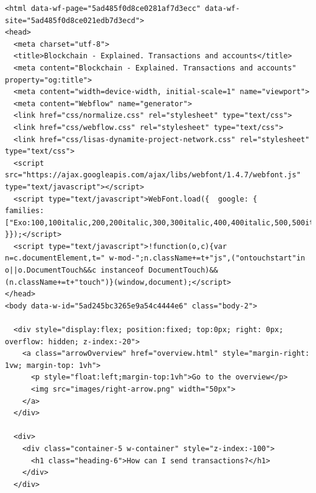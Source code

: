 \begin{lstlisting}
<html data-wf-page="5ad485f0d8ce0281af7d3ecc" data-wf-site="5ad485f0d8ce021edb7d3ecd">
<head>
  <meta charset="utf-8">
  <title>Blockchain - Explained. Transactions and accounts</title>
  <meta content="Blockchain - Explained. Transactions and accounts" property="og:title">
  <meta content="width=device-width, initial-scale=1" name="viewport">
  <meta content="Webflow" name="generator">
  <link href="css/normalize.css" rel="stylesheet" type="text/css">
  <link href="css/webflow.css" rel="stylesheet" type="text/css">
  <link href="css/lisas-dynamite-project-network.css" rel="stylesheet" type="text/css">
  <script src="https://ajax.googleapis.com/ajax/libs/webfont/1.4.7/webfont.js" type="text/javascript"></script>
  <script type="text/javascript">WebFont.load({  google: {    families: ["Exo:100,100italic,200,200italic,300,300italic,400,400italic,500,500italic,600,600italic,700,700italic,800,800italic,900,900italic","Roboto:100,100italic,300,300italic,regular,italic,500,500italic,700,700italic,900,900italic"]  }});</script>
  <script type="text/javascript">!function(o,c){var n=c.documentElement,t=" w-mod-";n.className+=t+"js",("ontouchstart"in o||o.DocumentTouch&&c instanceof DocumentTouch)&&(n.className+=t+"touch")}(window,document);</script>
</head>
<body data-w-id="5ad245bc3265e9a54c4444e6" class="body-2">

  <div style="display:flex; position:fixed; top:0px; right: 0px; overflow: hidden; z-index:-20">
    <a class="arrowOverview" href="overview.html" style="margin-right: 1vw; margin-top: 1vh">
      <p style="float:left;margin-top:1vh">Go to the overview</p>
      <img src="images/right-arrow.png" width="50px">
    </a>
  </div>

  <div>
    <div class="container-5 w-container" style="z-index:-100">
      <h1 class="heading-6">How can I send transactions?</h1>
    </div>
  </div>


\end{lstlisting}
